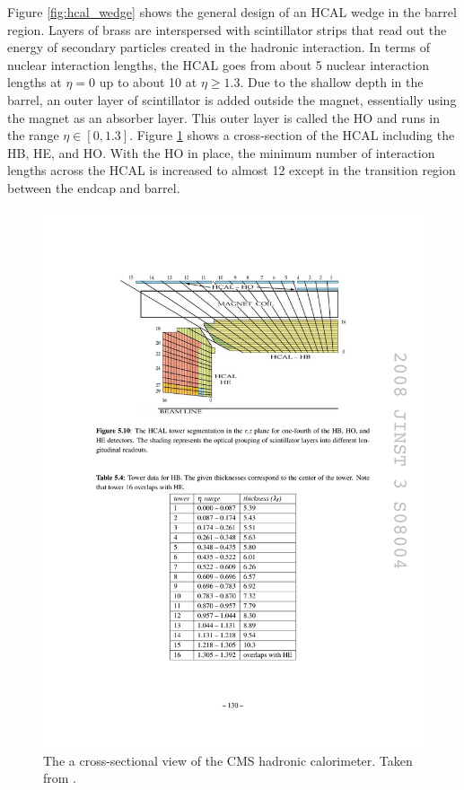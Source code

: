     Figure \ref{fig:hcal_wedge} shows the general design of an HCAL wedge in the barrel region. Layers of brass are interspersed with scintillator strips that read out the energy of secondary particles created in the hadronic interaction. In terms of nuclear interaction lengths, the HCAL goes from about 5 nuclear interaction lengths at $\eta = 0$ up to about 10 at $\eta \ge 1.3$. Due to the shallow depth in the barrel, an outer layer of scintillator is added outside the magnet, essentially using the magnet as an absorber layer. This outer layer is called the HO and runs in the range $\eta \in [0, 1.3]$. Figure \ref{fig:hcal_layout} shows a cross-section of the HCAL including the HB, HE, and HO. With the HO in place, the minimum number of interaction lengths across the HCAL is increased to almost 12 except in the transition region between the endcap and barrel.\cite[pg. 138]{cms_jinst}

    \begin{figure}[h!]
      \centering
      \includegraphics[width=.9\textwidth]{figures/cms_hcal_layout.pdf}
      \caption{The a cross-sectional view of the CMS hadronic calorimeter. Taken from \cite{cms_jinst}.}
      \label{fig:hcal_layout}
    \end{figure}

